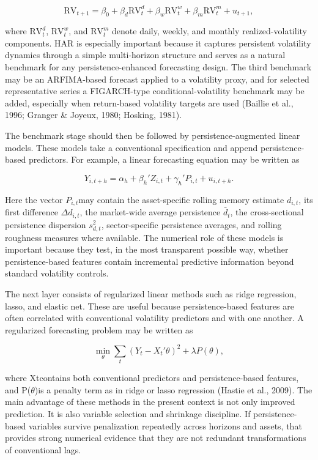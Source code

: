 \documentclass[12pt]{article}
\begin{document}
\[\mathrm{RV}_{t+1} = \beta_0 + \beta_d \mathrm{RV}_t^d + \beta_w \mathrm{RV}_t^w + \beta_m \mathrm{RV}_t^m + u_{t+1},\]

where $\mathrm{RV}_t^d$, $\mathrm{RV}_t^w$, and $\mathrm{RV}_t^m$ denote daily, weekly, and monthly realized-volatility components. HAR is especially important because it captures persistent volatility dynamics through a simple multi-horizon structure and serves as a natural benchmark for any persistence-enhanced forecasting design. The third benchmark may be an ARFIMA-based forecast applied to a volatility proxy, and for selected representative series a FIGARCH-type conditional-volatility benchmark may be added, especially when return-based volatility targets are used (Baillie et al., 1996; Granger \& Joyeux, 1980; Hosking, 1981).

The benchmark stage should then be followed by persistence-augmented linear models. These models take a conventional specification and append persistence-based predictors. For example, a linear forecasting equation may be written as

\[Y_{i,t+h} = \alpha_h + \beta_h' Z_{i,t} + \gamma_h' P_{i,t} + u_{i,t+h}.\]

Here the vector $P_{i,t}$may contain the asset-specific rolling memory estimate $d_{i,t}$, its first difference $\Delta d_{i,t}$, the market-wide average persistence $\bar{d}_t$, the cross-sectional persistence dispersion $s_{d,t}^2$, sector-specific persistence averages, and rolling roughness measures where available. The numerical role of these models is important because they test, in the most transparent possible way, whether persistence-based features contain incremental predictive information beyond standard volatility controls.

The next layer consists of regularized linear methods such as ridge regression, lasso, and elastic net. These are useful because persistence-based features are often correlated with conventional volatility predictors and with one another. A regularized forecasting problem may be written as

\[\min_{\theta}\sum_t\left(Y_t - X_t'\theta\right)^2 + \lambda P(\theta),\]

where Xtcontains both conventional predictors and persistence-based features, and P($\theta$)is a penalty term as in ridge or lasso regression (Hastie et al., 2009). The main advantage of these methods in the present context is not only improved prediction. It is also variable selection and shrinkage discipline. If persistence-based variables survive penalization repeatedly across horizons and assets, that provides strong numerical evidence that they are not redundant transformations of conventional lags.
\end{document}
